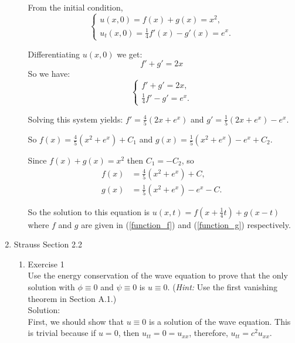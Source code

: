 \documentclass[12pt]{article}%
\begin{document}
\begin{enumerate}
\begin{enumerate}
        From the initial condition, 
        \begin{equation*}
            \begin{cases}
                u(x,0)=f(x)+g(x)=x^2,
                \\
                u_{t}(x,0)=\frac{1}{4}f'(x)-g'(x)=e^x.
            \end{cases}
        \end{equation*}

        Differentiating $u(x,0)$ we get:
        \[
        f'+g'=2x
        \]
        So we have:
        \begin{equation*}
            \begin{cases}
                f'+g'=2x,
                \\
                \frac{1}{4}f' - g'=e^x.
            \end{cases}
        \end{equation*}

        Solving this system yields: $f'=\frac{4}{5}(2x+e^x)$ and $g'=\frac{1}{5}(2x+e^x)-e^x$.

        So $f(x)=\frac{4}{5}(x^2+e^x)+C_1$ and $g(x)=\frac{1}{5}(x^2+e^x)-e^x+C_2$.

        Since $f(x)+g(x)=x^2$ then $C_1=-C_2$, so
        \begin{align}
            f(x)&=\frac{4}{5}(x^2+e^x)+C,\label{function_f}\\
            g(x)&=\frac{1}{5}(x^2+e^x)-e^x-C.\label{function_g}
        \end{align}

        So the solution to this equation is $u(x,t)=f(x+\frac{1}{4}t)+g(x-t)$
        where $f$ and $g$ are given in (\ref{function_f}) and
        (\ref{function_g}) respectively.

     \end{enumerate}
    
    \item Strauss Section 2.2 \smallskip
    \begin{enumerate}
        \item Exercise 1 \smallskip \\
        Use the energy conservation of the wave equation to prove that the only solution with $\phi \equiv 0$ and $\psi \equiv 0$ is $u \equiv 0$. (\emph{Hint:} Use the first vanishing theorem in Section A.1.) \smallskip \\
        Solution:\\
        First, we should show that $u\equiv0$ is a solution of the wave equation. This is trivial because
        if $u=0$, then $u_{tt}=0=u_{xx}$, therefore, $u_{tt}=c^2u_{xx}$.
        

\end{enumerate}
\end{enumerate}
\end{document}
